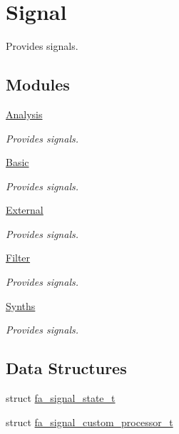 \hypertarget{group___fa_signal}{\section{Signal}
\label{group___fa_signal}
}


Provides signals.  


\subsection*{Modules}
\begin{DoxyCompactItemize}
\item 
\hyperlink{group___fa_signal_analysis}{Analysis}
\begin{DoxyCompactList}\small\item\em Provides signals. \end{DoxyCompactList}\item 
\hyperlink{group___fa_signal_basic}{Basic}
\begin{DoxyCompactList}\small\item\em Provides signals. \end{DoxyCompactList}\item 
\hyperlink{group___fa_signal_external}{External}
\begin{DoxyCompactList}\small\item\em Provides signals. \end{DoxyCompactList}\item 
\hyperlink{group___fa_signal_filter}{Filter}
\begin{DoxyCompactList}\small\item\em Provides signals. \end{DoxyCompactList}\item 
\hyperlink{group___fa_signal_synths}{Synths}
\begin{DoxyCompactList}\small\item\em Provides signals. \end{DoxyCompactList}\end{DoxyCompactItemize}
\subsection*{Data Structures}
\begin{DoxyCompactItemize}
\item 
struct \hyperlink{structfa__signal__state__t}{fa\-\_\-signal\-\_\-state\-\_\-t}
\item 
struct \hyperlink{structfa__signal__custom__processor__t}{fa\-\_\-signal\-\_\-custom\-\_\-processor\-\_\-t}
\end{DoxyCompactItemize}
